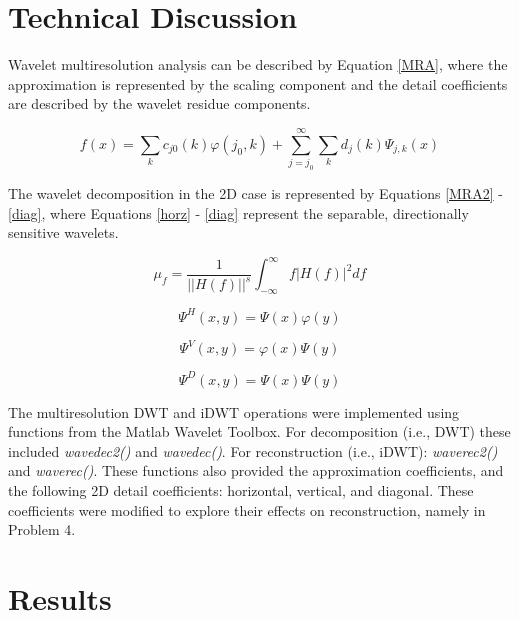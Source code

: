 \documentclass[./rarnold_report5.tex]{subfiles}
\begin{document}
\clearpage

\section*{Technical Discussion}

\noindent Wavelet multiresolution analysis can be described by Equation \eqref{MRA}, where the approximation is represented by the scaling component and the detail coefficients are described by the wavelet residue components.

\begin{equation}
\label{MRA}
f(x) = \sum_{k} c_{j0}(k) \varphi(j_0, k) + \sum_{j=j_0}^{\infty} \sum_{k} d_{j}(k)\Psi_{j,k}(x)
\end{equation}

\noindent The wavelet decomposition in the 2D case is represented by Equations \eqref{MRA2} - \eqref{diag}, where Equations \eqref{horz} - \eqref{diag} represent the separable, directionally sensitive wavelets.

\begin{equation}
\label{MRA2}
\mu_{f} = \frac{1}{||H(f)||^{s}} \int_{-\infty}^{\infty} f|H(f)|^{2} df
\end{equation}

\begin{equation}
\label{horz}
\Psi^{H}(x,y) = \Psi(x)\varphi(y)
\end{equation}

\begin{equation}
\label{vert}
\Psi^{V}(x,y) = \varphi(x)\Psi(y)
\end{equation}

\begin{equation}
\label{diag}
\Psi^{D}(x,y) = \Psi(x)\Psi(y)
\end{equation}

\noindent The multiresolution DWT and iDWT operations were implemented using functions from the Matlab Wavelet Toolbox.  For decomposition (i.e., DWT) these included \textit{wavedec2()} and \textit{wavedec()}.  For reconstruction (i.e., iDWT): \textit{waverec2()} and \textit{waverec()}.  These functions also provided the approximation coefficients, and the following 2D detail coefficients: horizontal, vertical, and diagonal.  These coefficients were modified to explore their effects on reconstruction, namely in Problem 4.

\clearpage

\section*{Results}
	
\end{document}
